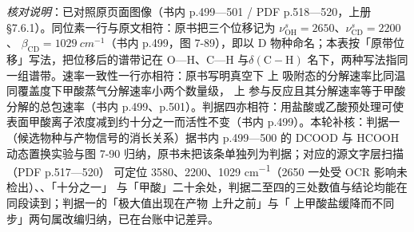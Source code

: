 \emph{核对说明}：已对照原页面图像（书内 p.499—501 / PDF p.518—520，上册 §7.6.1）。同位素一行与原文相符：原书把三个位移记为 $\nu^{s}_{\mathrm{OH}}=2650$、$\nu^{s}_{\mathrm{CD}}=2200$、
$\beta_{\mathrm{CD}}=\qty{1029}{cm^{-1}}$（书内 p.499，图 7-89），即以 D 物种命名；本表按「原带位移」写法，把位移后的谱带记在 O—H、C—H 与$\delta(\mathrm{C{-}H})$
名下，两种写法指同一组谱带。速率一致性一行亦相符：原书写明真空下  上 
吸附态的分解速率比同温同覆盖度下甲酸蒸气分解速率小两个数量级， 上  参与反应且其分解速率等于甲酸分解的总包速率（书内
p.499、p.501）。判据四亦相符：用盐酸或乙酸预处理可使  表面甲酸离子浓度减到约十分之一而活性不变（书内
p.499）。本轮补核：判据一（候选物种与产物信号的消长关系）据书内 p.499—500 的 DCOOD 与 HCOOH
动态置换实验与图 7-90 归纳，原书未把该条单独列为判据；对应的源文字层扫描（PDF p.517—520）
可定位 3580、2200、1029 \unit{cm^{-1}}（2650 一处受 OCR 影响未检出）、、「十分之一」
与「甲酸」二十余处，判据二至四的三处数值与结论均能在同段读到；判据一的「极大值出现在产物
上升之前」与「 上甲酸盐缓降而不同步」两句属改编归纳，已在台账中记差异。


